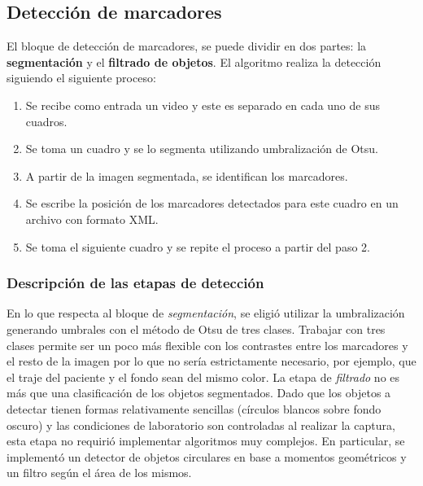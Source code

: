 \subsection{Detección de marcadores}
El bloque de detección de marcadores, se puede dividir en dos partes: la \textbf{segmentación} y el \textbf{filtrado de objetos}.
%
El algoritmo realiza la detección siguiendo el siguiente proceso:
%
\begin{enumerate}
  \item Se recibe como entrada un video y este es separado en cada uno de sus cuadros.
  \item Se toma un cuadro y se lo segmenta utilizando umbralización de Otsu.
  \item A partir de la imagen segmentada, se identifican los marcadores.
  \item Se escribe la posición de los marcadores detectados para este cuadro en un archivo con formato XML.
  \item Se toma el siguiente cuadro y se repite el proceso a partir del paso 2.
\end{enumerate}
%
\subsubsection{Descripción de las etapas de detección}
En lo que respecta al bloque de \textit{segmentación}, se eligió utilizar la umbralización generando umbrales con el método de Otsu\cite{otsu} de tres clases.
%
Trabajar con tres clases permite ser un poco más flexible con los contrastes entre los marcadores y el resto de la imagen por lo que no sería estrictamente necesario, por ejemplo, que el traje del paciente y el fondo sean del mismo color.
%
La etapa de \textit{filtrado} no es más que una clasificación de los objetos segmentados. Dado que los objetos a detectar tienen formas relativamente sencillas (círculos blancos sobre fondo oscuro) y las condiciones de laboratorio son controladas al realizar la captura, esta etapa no requirió implementar algoritmos muy complejos. En particular, se implementó un detector de objetos circulares en base a momentos geométricos\cite{imageMoments} y un filtro según el área de los mismos.
%
